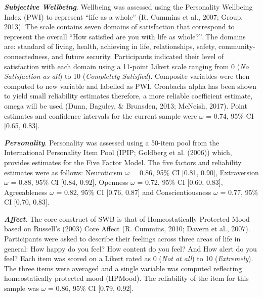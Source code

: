 \documentclass[man,floatsintext]{apa6}
\theoremstyle{definition}
\theoremstyle{definition}
\theoremstyle{definition}
\theoremstyle{remark}
\begin{document}
\textbf{\emph{Subjective Wellbeing}}. Wellbeing was assessed using the
Personality Wellbeing Index (PWI) to represent \enquote{life as a whole}
(R. Cummins et al., 2007; Group, 2013). The scale contains seven domains
of satisfaction that correspond to represent the overall \enquote{How
satisfied are you with life as whole?}. The domains are: standard of
living, health, achieving in life, relationships, safety,
community-connectedness, and future security. Participants indicated
their level of satisfaction with each domain using a 11-point Likert
scale ranging from 0 (\emph{No Satisfaction as all}) to 10
(\emph{Completely Satisfied}). Composite variables were then computed to
new variable and labelled as PWI. Cronbachs alpha has been shown to
yield small reliability estimates therefore, a more reliable coefficient
estimate, omega will be used (Dunn, Baguley, \& Brunsden, 2013; McNeish,
2017). Point estimates and confidence intervals for the current sample
were \(\omega\) = 0.74, 95\% CI {[}0.65, 0.83{]}.

\textbf{\emph{Personality}}. Personality was assessed using a 50-item
pool from the International Personality Item Pool (IPIP; Goldberg et al.
(2006)) which, provides estimates for the Five Factor Model. The five
factors and reliability estimates were as follows: Neuroticism
\(\omega\) = 0.86, 95\% CI {[}0.81, 0.90{]}, Extraversion \(\omega\) =
0.88, 95\% CI {[}0.84, 0.92{]}, Openness \(\omega\) = 0.72, 95\% CI
{[}0.60, 0.83{]}, Agreeableness \(\omega\) = 0.82, 95\% CI {[}0.76,
0.87{]} and Conscientiousness \(\omega\) = 0.77, 95\% CI {[}0.70,
0.83{]}.

\textbf{\emph{Affect}}. The core construct of SWB is that of
Homeostatically Protected Mood based on Russell's (2003) Core Affect (R.
Cummins, 2010; Davern et al., 2007). Participants were asked to describe
their feelings across three areas of life in general: How happy do you
feel? How content do you feel? And How alert do you feel? Each item was
scored on a Likert rated as 0 (\emph{Not at all}) to 10
(\emph{Extremely}). The three items were averaged and a single variable
was computed reflecting homeostatically protected mood (HPMood). The
reliability of the item for this sample was \(\omega\) = 0.86, 95\% CI
{[}0.79, 0.92{]}.
\end{document}
